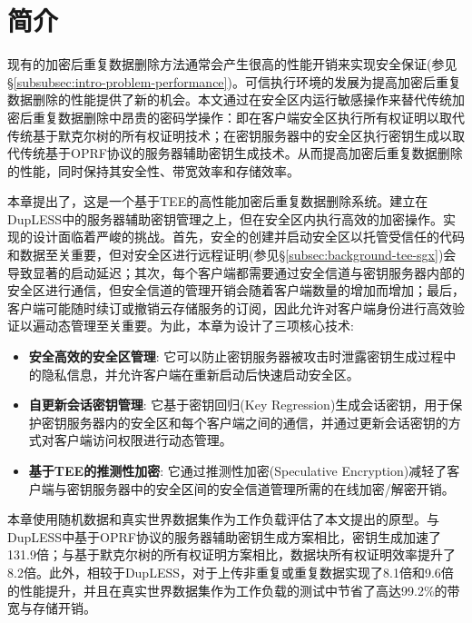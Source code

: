 \section{简介}
\label{sec:sgxdedup-introduction}

现有的加密后重复数据删除方法通常会产生很高的性能开销来实现安全保证(参见\S\ref{subsubsec:intro-problem-performance})。可信执行环境\cite{trustzone,sgx,MK-TME,AMDSEV}的发展为提高加密后重复数据删除的性能提供了新的机会。本文通过在安全区内运行敏感操作来替代传统加密后重复数据删除中昂贵的密码学操作：即在客户端安全区执行所有权证明以取代传统基于默克尔树的所有权证明技术；在密钥服务器中的安全区执行密钥生成以取代传统基于OPRF协议的服务器辅助密钥生成技术。从而提高加密后重复数据删除的性能，同时保持其安全性、带宽效率和存储效率。
 
本章提出了\sysnameS，这是一个基于TEE的高性能加密后重复数据删除系统。\sysnameS 建立在DupLESS\cite{bellare2013DupLESS}中的服务器辅助密钥管理之上，但在安全区内执行高效的加密操作。实现\sysnameS 的设计面临着严峻的挑战。首先，安全的创建并启动安全区以托管受信任的代码和数据至关重要，但对安全区进行远程证明(参见\S\ref{subsec:background-tee-sgx})会导致显著的启动延迟；其次，每个客户端都需要通过安全信道与密钥服务器内部的安全区进行通信，但安全信道的管理开销会随着客户端数量的增加而增加；最后，客户端可能随时续订或撤销云存储服务的订阅，因此允许对客户端身份进行高效验证以遍动态管理至关重要。为此，本章为\sysnameS 设计了三项核心技术: 

\begin{itemize}[leftmargin=*]
    \item \textbf{安全高效的安全区管理}:
        它可以防止密钥服务器被攻击时泄露密钥生成过程中的隐私信息，并允许客户端在重新启动后快速启动安全区。
    \item \textbf{自更新会话密钥管理}:
        它基于密钥回归(Key Regression)\cite{fu06}生成会话密钥，用于保护密钥服务器内的安全区和每个客户端之间的通信，并通过更新会话密钥的方式对客户端访问权限进行动态管理。
    \item \textbf{基于TEE的推测性加密}:
        它通过推测性加密(Speculative Encryption)\cite{eduardo2019Speculative}减轻了客户端与密钥服务器中的安全区间的安全信道管理所需的在线加密/解密开销。
\end{itemize}

本章使用随机数据和真实世界数据集\cite{fsl,meyer2011deduplication}作为工作负载评估了本文提出的\sysnameS 原型。与DupLESS\cite{bellare2013DupLESS}中基于OPRF协议的服务器辅助密钥生成方案相比，密钥生成加速了131.9倍；与基于默克尔树的所有权证明方案\cite{halevi11}相比，数据块所有权证明效率提升了8.2倍。此外，相较于DupLESS\cite{bellare2013DupLESS}，\sysnameS 对于上传非重复或重复数据实现了8.1倍和9.6倍的性能提升，并且在真实世界数据集作为工作负载的测试中节省了高达99.2\%的带宽与存储开销。

